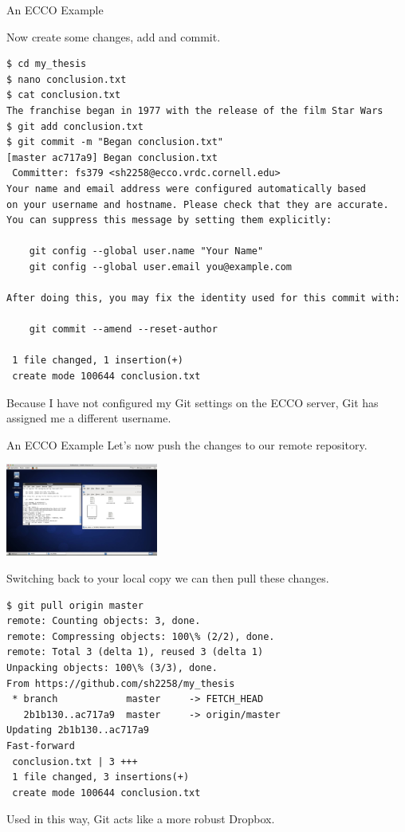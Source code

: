 \documentclass[10pt]{beamer}
\begin{document}
\begin{frame}[fragile]{An ECCO Example}

Now create some changes, add and commit.
\begin{lstlisting}
$ cd my_thesis
$ nano conclusion.txt
$ cat conclusion.txt
The franchise began in 1977 with the release of the film Star Wars
$ git add conclusion.txt
$ git commit -m "Began conclusion.txt"
[master ac717a9] Began conclusion.txt
 Committer: fs379 <sh2258@ecco.vrdc.cornell.edu>
Your name and email address were configured automatically based
on your username and hostname. Please check that they are accurate.
You can suppress this message by setting them explicitly:

    git config --global user.name "Your Name"
    git config --global user.email you@example.com

After doing this, you may fix the identity used for this commit with:

    git commit --amend --reset-author

 1 file changed, 1 insertion(+)
 create mode 100644 conclusion.txt
\end{lstlisting}
Because I have not configured my Git settings on the ECCO server, Git has assigned me a different username.





\end{frame}

\begin{frame}[fragile]{An ECCO Example}
Let's now push the changes to our remote repository.

\begin{center}
\includegraphics[width=5cm]{./auxfiles/ECCO2.jpg}
\end{center}

Switching back to your local copy we can then pull these changes.
\begin{lstlisting}
$ git pull origin master
remote: Counting objects: 3, done.
remote: Compressing objects: 100\% (2/2), done.
remote: Total 3 (delta 1), reused 3 (delta 1)
Unpacking objects: 100\% (3/3), done.
From https://github.com/sh2258/my_thesis
 * branch            master     -> FETCH_HEAD
   2b1b130..ac717a9  master     -> origin/master
Updating 2b1b130..ac717a9
Fast-forward
 conclusion.txt | 3 +++
 1 file changed, 3 insertions(+)
 create mode 100644 conclusion.txt
\end{lstlisting}


Used in this way, Git acts like a more robust Dropbox. \\


\end{frame}
\end{document}
